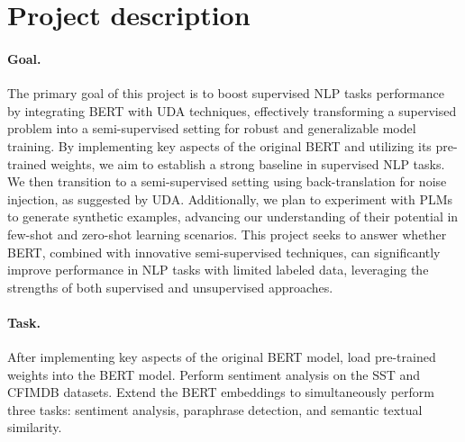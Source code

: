 \documentclass{article}
\begin{document}
\section{Project description}

\paragraph{Goal.} 
The primary goal of this project is to boost supervised NLP tasks performance by 
integrating BERT with UDA techniques, effectively transforming a supervised problem 
into a semi-supervised setting for robust and generalizable model training. By 
implementing key aspects of the original BERT and utilizing its pre-trained weights, 
we aim to establish a strong baseline in supervised NLP tasks. We then transition to 
a semi-supervised setting using back-translation for noise injection, as suggested by 
UDA. Additionally, we plan to experiment with PLMs to generate 
synthetic examples, advancing our understanding of their potential in few-shot and 
zero-shot learning scenarios. This project seeks to answer whether BERT, combined with 
innovative semi-supervised techniques, can significantly improve performance in NLP 
tasks with limited labeled data, leveraging the strengths of both supervised and 
unsupervised approaches.

\paragraph{Task.} 
After implementing key aspects of the original BERT model, 
load pre-trained weights into the BERT model. 
Perform sentiment analysis on the SST and CFIMDB datasets. 
Extend the BERT embeddings to simultaneously perform three tasks: 
sentiment analysis, paraphrase detection, and semantic textual similarity.
\end{document}
